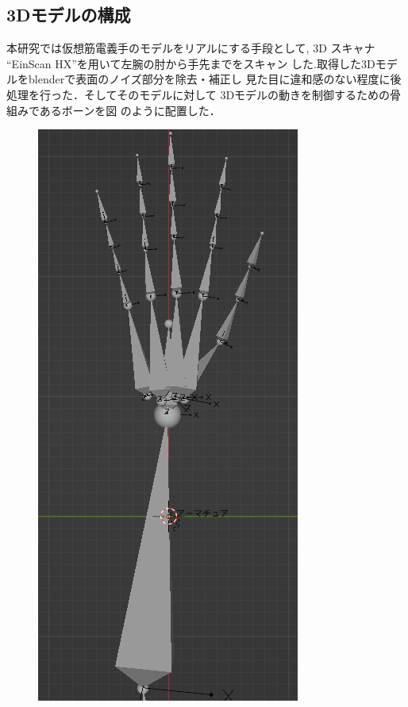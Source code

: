 \documentclass{ltjsarticle}
\begin{document}
	\subsection{3Dモデルの構成}
		本研究では仮想筋電義手のモデルをリアルにする手段として, 3D
		スキャナ ``EinScan HX''を用いて左腕の肘から手先までをスキャン
		した.取得した3Dモデルをblenderで表面のノイズ部分を除去・補正し
		見た目に違和感のない程度に後処理を行った．そしてそのモデルに対して
		3Dモデルの動きを制御するための骨組みであるボーンを図
		のように配置した．
		\begin{figure}[H]
		\centering
		\begin{minipage}{0.292\columnwidth}
		\centering
		\includegraphics[width = \columnwidth]{figs/handboneLat.png}

\end{minipage}
\end{figure}
\end{document}

